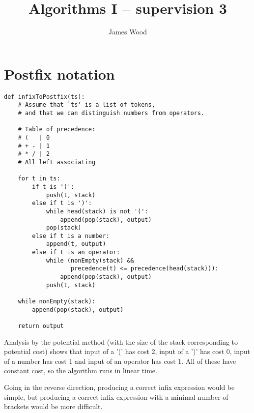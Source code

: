 \documentclass[11pt]{article}
\title{\textbf{Algorithms I -- supervision 3}}
\author{James Wood}
\begin{document}
\renewcommand{\labelenumi}{(\alph{enumi})}
\renewcommand{\labelenumii}{(\roman{enumii})}

\maketitle

\section{Postfix notation}
\begin{lstlisting}
def infixToPostfix(ts):
    # Assume that `ts' is a list of tokens,
    # and that we can distinguish numbers from operators.

    # Table of precedence:
    # (   | 0
    # + - | 1
    # * / | 2
    # All left associating

    for t in ts:
        if t is '(':
            push(t, stack)
        else if t is ')':
            while head(stack) is not '(':
                append(pop(stack), output)
            pop(stack)
        else if t is a number:
            append(t, output)
        else if t is an operator:
            while (nonEmpty(stack) &&
                   precedence(t) <= precedence(head(stack))):
                append(pop(stack), output)
            push(t, stack)

    while nonEmpty(stack):
        append(pop(stack), output)

    return output
\end{lstlisting}
Analysis by the potential method (with the size of the stack corresponding to potential cost) shows that input of a '(' has cost 2, input of a ')' has cost 0, input of a number has cost 1 and input of an operator has cost 1. All of these have constant cost, so the algorithm runs in linear time.

Going in the reverse direction, producing a correct infix expression would be simple, but producing a correct infix expression with a minimal number of brackets would be more difficult.
\end{document}
